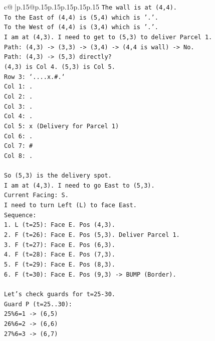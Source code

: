 \documentclass{article}
\begin{document}
{\begin{supertabular}{c@{$\;$}|p{.15\linewidth}@{}p{.15\linewidth}p{.15\linewidth}p{.15\linewidth}p{.15\linewidth}p{.15\linewidth}}
{{{\texttt{The wall is at (4,4).} \\
\texttt{To the East of (4,4) is (5,4) which is '.'.} \\
\texttt{To the West of (4,4) is (3,4) which is '.'.} \\
\texttt{I am at (4,3). I need to get to (5,3) to deliver Parcel 1.} \\
\texttt{Path: (4,3) {-}> (3,3) {-}> (3,4) {-}> (4,4 is wall) {-}> No.} \\
\texttt{Path: (4,3) {-}> (5,3) directly?} \\
\texttt{(4,3) is Col 4. (5,3) is Col 5.} \\
\texttt{Row 3: `....x.\#.`} \\
\texttt{Col 1: .} \\
\texttt{Col 2: .} \\
\texttt{Col 3: .} \\
\texttt{Col 4: .} \\
\texttt{Col 5: x (Delivery for Parcel 1)} \\
\texttt{Col 6: .} \\
\texttt{Col 7: \#} \\
\texttt{Col 8: .} \\
\\ 
\texttt{So (5,3) is the delivery spot.} \\
\texttt{I am at (4,3). I need to go East to (5,3).} \\
\texttt{Current Facing: S.} \\
\texttt{I need to turn Left (L) to face East.} \\
\texttt{Sequence:} \\
\texttt{1. L (t=25): Face E. Pos (4,3).} \\
\texttt{2. F (t=26): Face E. Pos (5,3). Deliver Parcel 1.} \\
\texttt{3. F (t=27): Face E. Pos (6,3).} \\
\texttt{4. F (t=28): Face E. Pos (7,3).} \\
\texttt{5. F (t=29): Face E. Pos (8,3).} \\
\texttt{6. F (t=30): Face E. Pos (9,3) {-}> BUMP (Border).} \\
\\ 
\texttt{Let's check guards for t=25{-}30.} \\
\texttt{Guard P (t=25..30):} \\
\texttt{25\%6=1 {-}> (6,5)} \\
\texttt{26\%6=2 {-}> (6,6)} \\
\texttt{27\%6=3 {-}> (6,7)} \\
}}}
\end{supertabular}}
\end{document}
